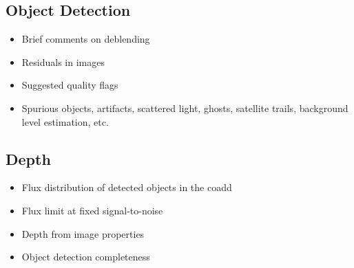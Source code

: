 



\subsection{Object Detection}

\begin{itemize}

\item Brief comments on deblending

\item Residuals in images

\item Suggested quality flags

\item Spurious objects, artifacts, scattered light, ghosts, satellite trails, background level estimation, etc.

\end{itemize}

\subsection{Depth}



\begin{itemize}

\item Flux distribution of detected objects in the coadd

\item Flux limit at fixed signal-to-noise

\item Depth from image properties

\item Object detection completeness

\end{itemize}

